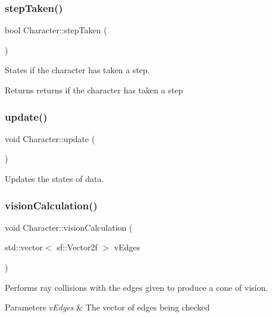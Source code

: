 \subsubsection{\texorpdfstring{step\+Taken()}{stepTaken()}}
{\footnotesize\ttfamily bool Character\+::step\+Taken (\begin{DoxyParamCaption}{ }\end{DoxyParamCaption})}



States if the character has taken a step. 

\begin{DoxyReturn}{Returns}
returns if the character has taken a step 
\end{DoxyReturn}
\mbox{\label{class_character_ab9168412ef9b2c8726b0de4dfb63e604}} 
\subsubsection{\texorpdfstring{update()}{update()}}
{\footnotesize\ttfamily void Character\+::update (\begin{DoxyParamCaption}{ }\end{DoxyParamCaption})}



Updates the states of data. 

\mbox{\label{class_character_a9852ca921b44387636f6dc268afc95bb}} 
\subsubsection{\texorpdfstring{vision\+Calculation()}{visionCalculation()}}
{\footnotesize\ttfamily void Character\+::vision\+Calculation (\begin{DoxyParamCaption}\item[{std\+::vector$<$ sf\+::\+Vector2f $>$}]{v\+Edges }\end{DoxyParamCaption})}



Performs ray collisions with the edges given to produce a cone of vision. 


\begin{DoxyParams}{Parameters}
{\em v\+Edges} & The vector of edges being checked \\
\hline
\end{DoxyParams}


